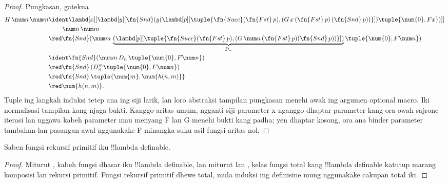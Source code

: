 \documentclass[../../../include/open-logic-section]{subfiles}
\begin{document}
\begin{proof}
  Pungkasan, gatekna
  \begin{align*}
    H\,\num n\,\num m &\ident \lambd[x][\lambd[y][\fn{Snd} (y
        (\lambd[p][\tuple{\fn{Succ} (\fn{Fst}\, p), (G\, x\,
          (\fn{Fst}\, p)\, (\fn{Snd}\, p))}]) \tuple{\num{0}, F x})]]\\
    & \qquad\,\num n\, \num m\\
    & \red \fn{Snd} (\num m \,
    \underbrace{(\lambd[p][\tuple{\fn{Succ} (\fn{Fst}\, p), (G \,\num n\,
      (\fn{Fst}\, p) (\fn{Snd}\, p))}])}_{D_n} \tuple{\num{0}, F \num n})\\
    & \ident \fn{Snd} (\num m \, D_n\, \tuple{\num{0}, F \num n})\\
    & \red \fn{Snd} \,(D_n^m  \tuple{\num{0}, F \num n})\\
    & \red \fn{Snd} \,\tuple{\num{m}, \num{h(n, m)}} \\
    & \red \num{h(n,m)}. 
  \end{align*}  
Tuple ing langkah induksi tetep ana ing siji larik, lan loro abstraksi tampilan pungkasan menehi awak ing argumen optional macro. Iki normalisasi tampilan kang njaga bukti. Kanggo aritas umum, ngganti siji parameter x nganggo dhaptar parameter kang ora owah sajrone iterasi lan nggawa kabeh parameter mau menyang F lan G menehi bukti kang padha; yen dhaptar kosong, ora ana binder parameter tambahan lan pasangan awal nggunakake F minangka suku asil fungsi aritas nol.\end{proof}


\begin{prop}
  Saben fungsi rekursif primitif iku !!{lambda definable}.
\end{prop}

\begin{proof}
  Miturut , kabeh fungsi dhasar iku !!{lambda definable},
  lan miturut  lan , kelas fungsi total kang
  !!{lambda definable} katutup marang komposisi lan rekursi primitif.
Fungsi rekursif primitif dhewe total, mula induksi ing definisine mung nggunakake cakupan total iki.\end{proof}
\end{document}
